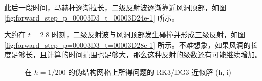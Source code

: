 此后一段时间，马赫杆逐渐拉长，二级反射波逐渐靠近风洞顶部，如图 \ref{fig:forward_step_p=00003D3_t=00003D24e-1}
所示。

大约在 $t=2.8$ 时刻，二级反射波与风洞顶部发生碰撞并形成三级反射，如图 \ref{fig:forward_step_p=00003D3_t=00003D28e-1}
所示。不难想象，如果风洞的长度足够长，且计算的时间范围也足够大，那么这种反射的级数还有可能继续增加。

\begin{figure}[h!]
\ContinuedFloat
\begin{centering}
\par\end{centering}
\begin{centering}
\par\end{centering}
\caption{在 $h=1/200$ 的伪结构网格上所得问题的
RK3/DG3 近似解 (h, i)}
\end{figure}

